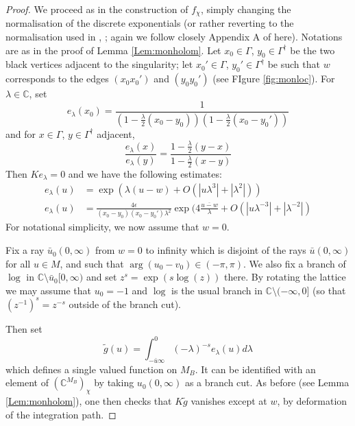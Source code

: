 \documentclass[10pt]{article}
\newcommand{\C}{\mathbb{C}}
\newcommand{\dg}{\dagger}
\begin{document}
\begin{proof}
We proceed as in the construction of $f_\chi$, simply changing the normalisation of the discrete exponentials (or rather reverting to the normalisation used in \cite{Ken_isoradial}, \cite{SmiChe_isoradial}; again we follow closely Appendix A of \cite{SmiChe_isoradial} here). Notations are as in the proof of Lemma \ref{Lem:monholom}. Let $x_0\in\Gamma$, $y_0\in\Gamma^\dg$ be the two black vertices adjacent to the singularity; let $x_0'\in\Gamma$, $y_0'\in\Gamma^\dg$ be such that $w$ corresponds to the edges $(x_0x_0')$ and $(y_0y_0')$ (see FIgure \ref{fig:monloc}). For $\lambda\in\C$, set
$$e_\lambda(x_0)=\frac 1{(1-\frac\lambda 2(x_0-y_0))(1-\frac\lambda 2(x_0-y_0'))}$$
and for $x\in\Gamma$, $y\in\Gamma^\dg$ adjacent, 
 $$\frac{e_\lambda(x)}{e_\lambda(y)}=\frac {1-\frac \lambda 2(y-x)}
{1-\frac \lambda 2(x-y)}$$
Then $K e_\lambda=0$ and we have the following estimates:
\begin{align*}
e_\lambda(u)&=\exp(\lambda (u-w)+O(|u\lambda^3|+|\lambda^2|))\\
%
e_\lambda(u)&=\frac{4\epsilon}{(x_0-y_0)(x_0-y_0')\lambda^2}\exp(4\frac{\overline{u-w}}\lambda+O(|u\lambda^{-3}|+|\lambda^{-2}|)
\end{align*}
%
For notational simplicity, we now assume that $w=0$.

Fix a ray $\bar u_0(0,\infty)$ from $w=0$ to infinity which is disjoint of the rays $\bar u(0,\infty)$ for all $u\in M$, and such that $\arg(u_0-v_0)\in(-\pi,\pi)$. We also fix a branch of $\log$ in $\C\setminus \bar u_0[0,\infty)$ and set $z^s=\exp(s\log(z))$ there. By rotating the lattice we may assume that $u_0=-1$ and $\log$ is the usual branch in $\C\setminus (-\infty,0]$ (so that $(z^{-1})^s=z^{-s}$ outside of the branch cut).

Then set
$$\tilde g(u)=\int_{-\bar u\infty}^0(-\lambda)^{-s}e_\lambda(u)d\lambda$$
which defines a single valued function on $M_B$. It can be identified with an element of $(\C^{M_B})_\chi$ by taking $u_0(0,\infty)$ as a branch cut. As before (see Lemma \ref{Lem:monholom}), one then checks that $K\tilde g$ vanishes except at $w$, by deformation of the integration path.


\end{proof}
\end{document}
